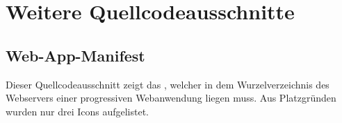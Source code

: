\chapter{Weitere Quellcodeausschnitte}
\label{chap:weiterequellcodeausschnitte}

\section*{Web-App-Manifest}
\label{sec:webappmanifest}
Dieser Quellcodeausschnitt zeigt das , welcher in dem Wurzelverzeichnis
des Webservers einer progressiven Webanwendung liegen muss. Aus Platzgründen wurden nur drei
Icons aufgelistet.
\inputminted{jsx}{snippets/json/manifest.json}
